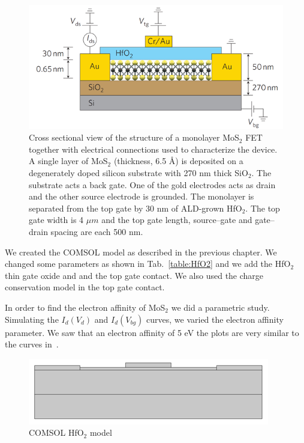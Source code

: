 \documentclass[12pt,a4paper,titlepage]{article}
\begin{document}
\begin{figure}[h]
	\centering
	\includegraphics[width=1\textwidth]{Immagini/HfO2_model.png} 
	\caption{Cross sectional view of the structure of a monolayer MoS$_2$ FET together with electrical connections used to characterize the device. A single layer of MoS$_2$ (thickness, 6.5 \AA) is deposited on a degenerately doped silicon substrate with 270 nm thick SiO$_2$. The substrate acts a back gate. One of the gold electrodes acts as drain and the other source electrode is grounded. The monolayer is separated from the top gate by 30 nm of ALD-grown HfO$_2$. The top gate width is 4 $\mu m$ and the top gate length, source–gate and gate–drain spacing are each 500 nm.~\cite{Radisavljevic:Si_MoS2}}
	\label{fig:HfO2_model}
\end{figure} 

We created the COMSOL model as described in the previous chapter. We changed some parameters as shown in Tab.~\ref{table:HfO2} and we add the HfO$_2$ thin gate oxide and and the top gate contact. We also used the charge conservation model in the top gate contact. 

In order to find the electron affinity of MoS$_2$ we did a parametric study. Simulating the $I_d(V_d)$ and $I_d(V_{bg})$ curves, we varied the electron affinity parameter. We saw that an electron affinity of 5 eV the plots are very similar to the curves in~\cite{Radisavljevic:Si_MoS2}.

\begin{figure}[H]
	\centering
	\includegraphics[width=.8\textwidth]{Immagini/HfO2_model_comsol.png} 
	\caption{COMSOL HfO$_2$ model}
	\label{fig:HfO2_model_comsol}
\end{figure} 
	
\end{document}
